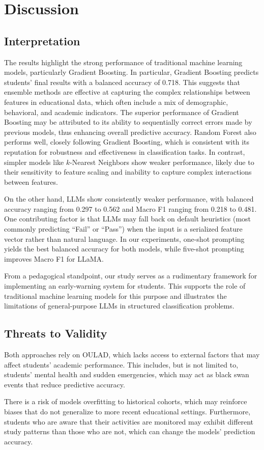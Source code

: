 \section{Discussion}
\subsection{Interpretation}
The results highlight the strong performance of traditional machine learning models, particularly Gradient Boosting. In particular, Gradient Boosting predicts students' final results with a balanced accuracy of 0.718. This suggests that ensemble methods are effective at capturing the complex relationships between features in educational data, which often include a mix of demographic, behavioral, and academic indicators. The superior performance of Gradient Boosting may be attributed to its ability to sequentially correct errors made by previous models, thus enhancing overall predictive accuracy. Random Forest also performs well, closely following Gradient Boosting, which is consistent with its reputation for robustness and effectiveness in classification tasks. In contrast, simpler models like $k$-Nearest Neighbors show weaker performance, likely due to their sensitivity to feature scaling and inability to capture complex interactions between features.

On the other hand, LLMs show consistently weaker performance, with balanced accuracy ranging from 0.297 to 0.562 and Macro F1 ranging from 0.218 to 0.481. One contributing factor is that LLMs may fall back on default heuristics (most commonly predicting ``Fail'' or ``Pass'') when the input is a serialized feature vector rather than natural language. In our experiments, one-shot prompting yields the best balanced accuracy for both models, while five-shot prompting improves Macro F1 for LLaMA.

From a pedagogical standpoint, our study serves as a rudimentary framework for implementing an early-warning system for students. This supports the role of traditional machine learning models for this purpose and illustrates the limitations of general-purpose LLMs in structured classification problems.

\subsection{Threats to Validity}
Both approaches rely on OULAD, which lacks access to external factors that may affect students' academic performance. This includes, but is not limited to, students' mental health and sudden emergencies, which may act as black swan events that reduce predictive accuracy.

There is a risk of models overfitting to historical cohorts, which may reinforce biases that do not generalize to more recent educational settings. Furthermore, students who are aware that their activities are monitored may exhibit different study patterns than those who are not, which can change the models' prediction accuracy.